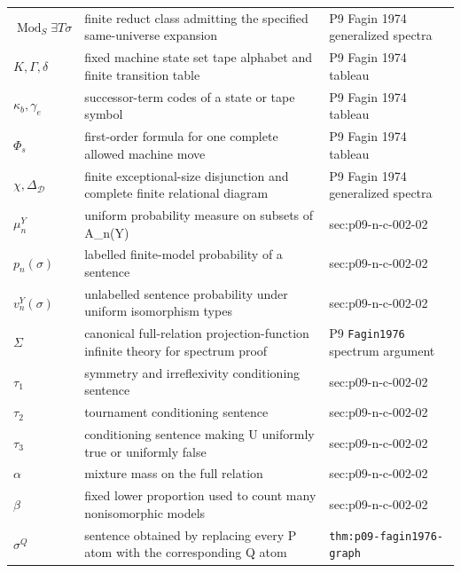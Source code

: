 \begin{longtable}{@{}p{}p{}p{}@{}}
\(\operatorname{Mod}_S\exists T\sigma\) & finite reduct class admitting the specified same-universe expansion & P9 Fagin 1974 generalized spectra \\
\(K,\allowbreak \Gamma,\allowbreak \delta\) & fixed machine state set tape alphabet and finite transition table & P9 Fagin 1974 tableau \\
\(\kappa_b,\allowbreak \gamma_e\) & successor-term codes of a state or tape symbol & P9 Fagin 1974 tableau \\
\(\Phi_s\) & first-order formula for one complete allowed machine move & P9 Fagin 1974 tableau \\
\(\chi,\allowbreak \Delta_{\mathcal D}\) & finite exceptional-size disjunction and complete finite relational diagram & P9 Fagin 1974 generalized spectra \\
\(\mu_n^Y\) & uniform probability measure on subsets of A\_n(Y) & sec:\allowbreak{}p09-\allowbreak{}n-\allowbreak{}c-\allowbreak{}002-\allowbreak{}02 \\
\(p_n(\sigma)\) & labelled finite-model probability of a sentence & sec:\allowbreak{}p09-\allowbreak{}n-\allowbreak{}c-\allowbreak{}002-\allowbreak{}02 \\
\(v_n^Y(\sigma)\) & unlabelled sentence probability under uniform isomorphism types & sec:\allowbreak{}p09-\allowbreak{}n-\allowbreak{}c-\allowbreak{}002-\allowbreak{}02 \\
\(\Sigma\) & canonical full-relation projection-function infinite theory for spectrum proof & P9 \texttt{Fagin1976} spectrum argument \\
\(\tau_1\) & symmetry and irreflexivity conditioning sentence & sec:\allowbreak{}p09-\allowbreak{}n-\allowbreak{}c-\allowbreak{}002-\allowbreak{}02 \\
\(\tau_2\) & tournament conditioning sentence & sec:\allowbreak{}p09-\allowbreak{}n-\allowbreak{}c-\allowbreak{}002-\allowbreak{}02 \\
\(\tau_3\) & conditioning sentence making U uniformly true or uniformly false & sec:\allowbreak{}p09-\allowbreak{}n-\allowbreak{}c-\allowbreak{}002-\allowbreak{}02 \\
\(\alpha\) & mixture mass on the full relation & sec:\allowbreak{}p09-\allowbreak{}n-\allowbreak{}c-\allowbreak{}002-\allowbreak{}02 \\
\(\beta\) & fixed lower proportion used to count many nonisomorphic models & sec:\allowbreak{}p09-\allowbreak{}n-\allowbreak{}c-\allowbreak{}002-\allowbreak{}02 \\
\(\sigma^Q\) & sentence obtained by replacing every P atom with the corresponding Q atom & \texttt{thm:\allowbreak{}p09-\allowbreak{}fagin1976-\allowbreak{}graph} \\

\end{longtable}
